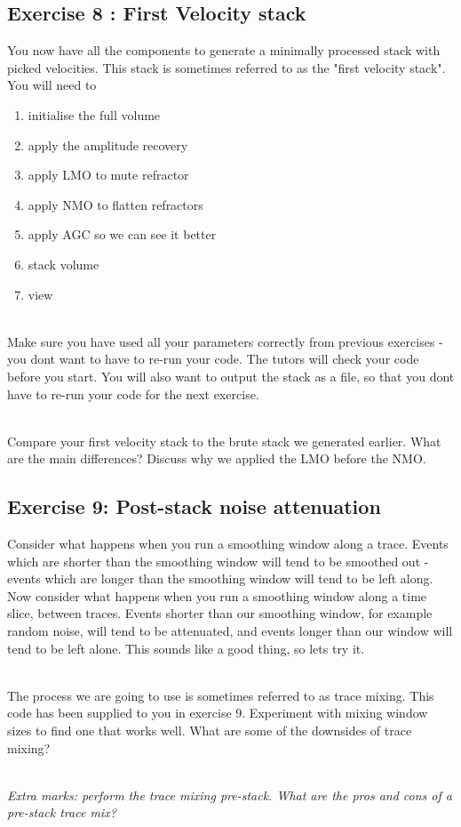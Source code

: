 \subsection*{Exercise 8 : First Velocity stack}
You now have all the components to generate a minimally processed stack with picked velocities.  This stack is sometimes referred to as the "first velocity stack".  You will need to
\begin{enumerate}
\item initialise the full volume
\item apply the amplitude recovery
\item apply LMO to mute refractor
\item apply NMO to flatten refractors
\item apply AGC so we can see it better
\item stack volume
\item view
\end{enumerate}
\par~\\
Make sure you have used all your parameters correctly from previous exercises - you dont want to have to re-run your code.  The tutors will check your code before you start.  You will also want to output the stack as a file, so that you dont have to re-run your code for the next exercise.
\par~\\
Compare your first velocity stack to the brute stack we generated earlier. What are the main differences?  Discuss why we applied the LMO before the NMO.

\subsection*{Exercise 9: Post-stack noise attenuation}
Consider what happens when you run a smoothing window along a trace.  Events which are shorter than the smoothing window will tend to be smoothed out - events which are longer than the smoothing window will tend to be left along. Now consider what happens when you run a smoothing window along a time slice, between traces.  Events shorter than our smoothing window, for example random noise, will tend to be attenuated, and events longer than our window will tend to be left alone. This sounds like a good thing, so lets try it.
\par~\\
The process we are going to use is sometimes referred to as trace mixing. This code has been supplied to you in exercise 9. Experiment with mixing window sizes to find one that works well.  What are some of the downsides of trace mixing?
\par~\\
\emph{Extra marks: perform the trace mixing pre-stack.  What are the pros and cons of a pre-stack trace mix?}

